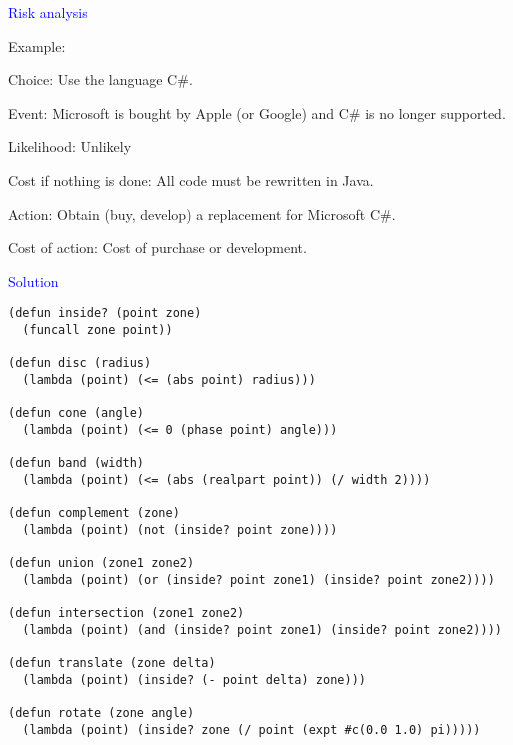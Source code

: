 \documentclass{slides}
\newcommand{\ti}[1]{\begin{center}\Large{\textcolor{blue}{#1}}\end{center}}
\begin{document}
\begin{slide}\ti{Risk analysis}

Example:

Choice: Use the language C\#.

Event: Microsoft is bought by Apple (or Google) and C\# is no longer
supported.

Likelihood: Unlikely

Cost if nothing is done: All code must be rewritten in Java.

Action: Obtain (buy, develop) a replacement for Microsoft C\#.

Cost of action: Cost of purchase or development.

\vfill\end{slide}
\begin{slide}\ti{Solution}

{\tiny\begin{verbatim}
(defun inside? (point zone)
  (funcall zone point))

(defun disc (radius)
  (lambda (point) (<= (abs point) radius)))

(defun cone (angle)
  (lambda (point) (<= 0 (phase point) angle)))

(defun band (width)
  (lambda (point) (<= (abs (realpart point)) (/ width 2))))

(defun complement (zone)
  (lambda (point) (not (inside? point zone))))

(defun union (zone1 zone2)
  (lambda (point) (or (inside? point zone1) (inside? point zone2))))

(defun intersection (zone1 zone2)
  (lambda (point) (and (inside? point zone1) (inside? point zone2))))

(defun translate (zone delta)
  (lambda (point) (inside? (- point delta) zone)))

(defun rotate (zone angle)
  (lambda (point) (inside? zone (/ point (expt #c(0.0 1.0) pi)))))
\end{verbatim}
}

\vfill\end{slide}


\end{document}
